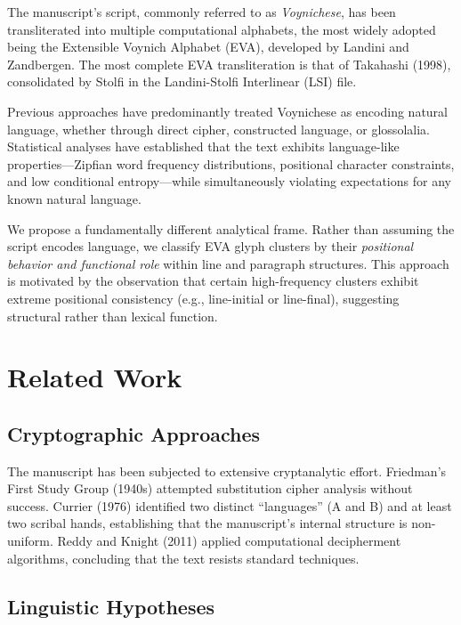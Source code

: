 \documentclass[11pt,a4paper,twocolumn]{article}
\begin{document}
The manuscript's script, commonly referred to as \textit{Voynichese}, has been transliterated into multiple computational alphabets, the most widely adopted being the Extensible Voynich Alphabet (EVA), developed by Landini and Zandbergen. The most complete EVA transliteration is that of Takahashi (1998), consolidated by Stolfi in the Landini-Stolfi Interlinear (LSI) file.

Previous approaches have predominantly treated Voynichese as encoding natural language, whether through direct cipher, constructed language, or glossolalia. Statistical analyses have established that the text exhibits language-like properties---Zipfian word frequency distributions, positional character constraints, and low conditional entropy---while simultaneously violating expectations for any known natural language.

We propose a fundamentally different analytical frame. Rather than assuming the script encodes language, we classify EVA glyph clusters by their \textit{positional behavior and functional role} within line and paragraph structures. This approach is motivated by the observation that certain high-frequency clusters exhibit extreme positional consistency (e.g., line-initial or line-final), suggesting structural rather than lexical function.

\section{Related Work}
\label{sec:related}

\subsection{Cryptographic Approaches}

The manuscript has been subjected to extensive cryptanalytic effort. Friedman's First Study Group (1940s) attempted substitution cipher analysis without success. Currier (1976) identified two distinct ``languages'' (A and B) and at least two scribal hands, establishing that the manuscript's internal structure is non-uniform. Reddy and Knight (2011) applied computational decipherment algorithms, concluding that the text resists standard techniques.

\subsection{Linguistic Hypotheses}
\end{document}
